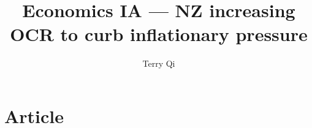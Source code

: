 \documentclass[a4paper,12pt]{article}
\title{Economics IA --- NZ increasing OCR to curb inflationary pressure}
\author{Terry Qi}
\begin{document}
\maketitle
\newpage

\section{Article}
\end{document}
